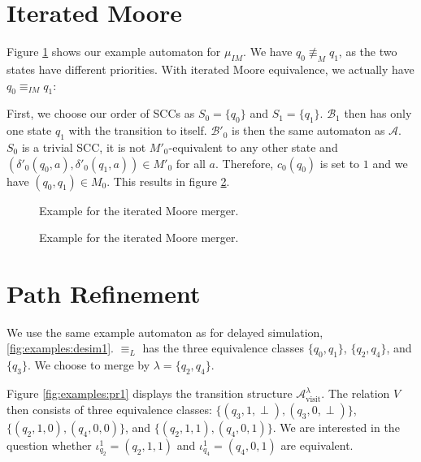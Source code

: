 \section{Iterated Moore}
Figure \ref{fig:examples:im1} shows our example automaton for $\mu_{IM}$. We have $q_0 \not\equiv_M q_1$, as the two states have different priorities. With iterated Moore equivalence, we actually have $q_0 \equiv_{IM} q_1$:

First, we choose our order of SCCs as $S_0 = \{q_0\}$ and $S_1 = \{q_1\}$. $\mathcal{B}_1$ then has only one state $q_1$ with the transition to itself. $\mathcal{B}'_0$ is then the same automaton as $\mathcal{A}$. $S_0$ is a trivial SCC, it is not $M'_0$-equivalent to any other state and $(\delta'_0(q_0, a), \delta'_0(q_1, a)) \in M'_0$ for all $a$. Therefore, $c_0(q_0)$ is set to $1$ and we have $(q_0, q_1) \in M_0$. This results in figure \ref{fig:examples:im2}.

\begin{figure}
\centering
{}
\caption{Example for the iterated Moore merger.}
\label{fig:examples:im1}
\end{figure}


\begin{figure}
\centering
{}
\caption{Example for the iterated Moore merger.}
\label{fig:examples:im2}
\end{figure}


\section{Path Refinement}
We use the same example automaton as for delayed simulation, \ref{fig:examples:desim1}. $\equiv_L$ has the three equivalence classes $\{q_0, q_1\}$, $\{q_2, q_4\}$, and $\{q_3\}$. We choose to merge by $\lambda = \{q_2, q_4\}$.

Figure \ref{fig:examples:pr1} displays the transition structure $\mathcal{A}^\lambda_\text{visit}$. The relation $V$ then consists of three equivalence classes: $\{(q_3, 1, \perp), (q_3, 0, \perp)\}$, $\{(q_2, 1, 0), (q_4, 0, 0)\}$, and $\{(q_2, 1, 1), (q_4, 0, 1)\}$. We are interested in the question whether $\iota_{q_2}^1 = (q_2, 1, 1)$ and $\iota_{q_4}^1 = (q_4, 0, 1)$ are equivalent.

